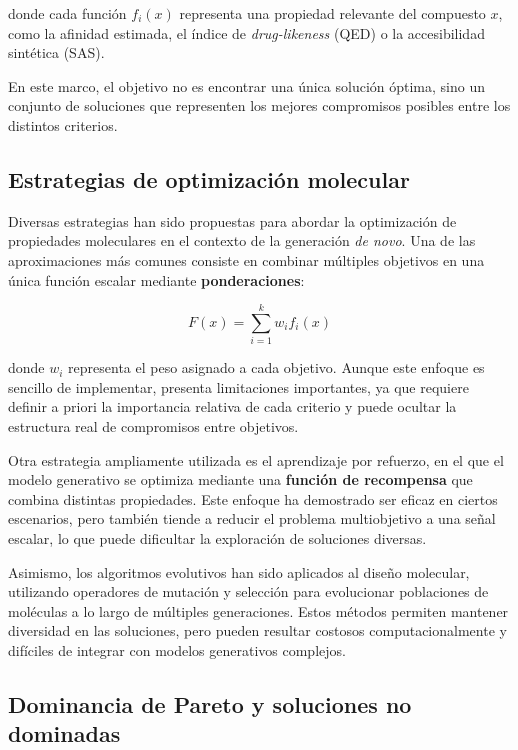 \documentclass[IB]{TFUOC}%
\begin{document}
donde cada función $f_i(x)$ representa una propiedad relevante del compuesto $x$, como la afinidad estimada, el índice de \textit{drug-likeness} (QED) o la accesibilidad sintética (SAS).

En este marco, el objetivo no es encontrar una única solución óptima, sino un conjunto de soluciones que representen los mejores compromisos posibles entre los distintos criterios. 

\subsection{Estrategias de optimización molecular}

Diversas estrategias han sido propuestas para abordar la optimización de propiedades moleculares en el contexto de la generación \textit{de novo}. Una de las aproximaciones más comunes consiste en combinar múltiples objetivos en una única función escalar mediante \textbf{ponderaciones}:

\begin{equation}
F(x) = \sum_{i=1}^{k} w_i f_i(x)
\end{equation}

donde $w_i$ representa el peso asignado a cada objetivo. Aunque este enfoque es sencillo de implementar, presenta limitaciones importantes, ya que requiere definir a priori la importancia relativa de cada criterio y puede ocultar la estructura real de compromisos entre objetivos.

Otra estrategia ampliamente utilizada es el aprendizaje por refuerzo, en el que el modelo generativo se optimiza mediante una \textbf{función de recompensa} que combina distintas propiedades. Este enfoque ha demostrado ser eficaz en ciertos escenarios, pero también tiende a reducir el problema multiobjetivo a una señal escalar, lo que puede dificultar la exploración de soluciones diversas.

Asimismo, los algoritmos evolutivos han sido aplicados al diseño molecular, utilizando operadores de mutación y selección para evolucionar poblaciones de moléculas a lo largo de múltiples generaciones. Estos métodos permiten mantener diversidad en las soluciones, pero pueden resultar costosos computacionalmente y difíciles de integrar con modelos generativos complejos.

\subsection{Dominancia de Pareto y soluciones no dominadas}
\end{document}
